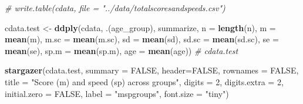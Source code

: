 \documentclass[11pt,,]{article}
\newenvironment{Shaded}{\begin{snugshade}}{\end{snugshade}}
\newcommand{\KeywordTok}[1]{\textcolor[rgb]{0.13,0.29,0.53}{\textbf{{#1}}}}
\newcommand{\DataTypeTok}[1]{\textcolor[rgb]{0.13,0.29,0.53}{{#1}}}
\newcommand{\DecValTok}[1]{\textcolor[rgb]{0.00,0.00,0.81}{{#1}}}
\newcommand{\StringTok}[1]{\textcolor[rgb]{0.31,0.60,0.02}{{#1}}}
\newcommand{\CommentTok}[1]{\textcolor[rgb]{0.56,0.35,0.01}{\textit{{#1}}}}
\newcommand{\OtherTok}[1]{\textcolor[rgb]{0.56,0.35,0.01}{{#1}}}
\newcommand{\NormalTok}[1]{{#1}}
\begin{document}
\begin{table}[!htbp]
\end{table}

\begin{Shaded}
\begin{Highlighting}[]
\CommentTok{# write.table(cdata, file = "../data/totalscoresandspeeds.csv")}
\end{Highlighting}
\end{Shaded}

\begin{Shaded}
\begin{Highlighting}[]
\NormalTok{cdata.test <-}\StringTok{ }\KeywordTok{ddply}\NormalTok{(cdata, .(age_group), summarize,}
                    \DataTypeTok{n =} \KeywordTok{length}\NormalTok{(n),}
                    \DataTypeTok{m =} \KeywordTok{mean}\NormalTok{(m),}
                    \DataTypeTok{m.sc =} \KeywordTok{mean}\NormalTok{(m.sc),}
                    \DataTypeTok{sd =} \KeywordTok{mean}\NormalTok{(sd),}
                    \DataTypeTok{sd.sc =} \KeywordTok{mean}\NormalTok{(sd.sc),}
                    \DataTypeTok{se =} \KeywordTok{mean}\NormalTok{(se),}
                    \DataTypeTok{sp.m =} \KeywordTok{mean}\NormalTok{(sp.m),}
                    \DataTypeTok{age =} \KeywordTok{mean}\NormalTok{(age))}
\CommentTok{# cdata.test}
\end{Highlighting}
\end{Shaded}

\begin{Shaded}
\begin{Highlighting}[]
\KeywordTok{stargazer}\NormalTok{(cdata.test, }\DataTypeTok{summary =} \OtherTok{FALSE}\NormalTok{, }\DataTypeTok{header=}\OtherTok{FALSE}\NormalTok{, }\DataTypeTok{rownames =} \OtherTok{FALSE}\NormalTok{,}
          \DataTypeTok{title =} \StringTok{"Score (m) and speed (sp) across groups"}\NormalTok{,}
          \DataTypeTok{digits =} \DecValTok{2}\NormalTok{, }\DataTypeTok{digits.extra =} \DecValTok{2}\NormalTok{, }\DataTypeTok{initial.zero =} \OtherTok{FALSE}\NormalTok{,}
          \DataTypeTok{label =} \StringTok{"mspgroups"}\NormalTok{,}
          \DataTypeTok{font.size =} \StringTok{"tiny"}\NormalTok{)}
\end{Highlighting}
\end{Shaded}
\end{document}
